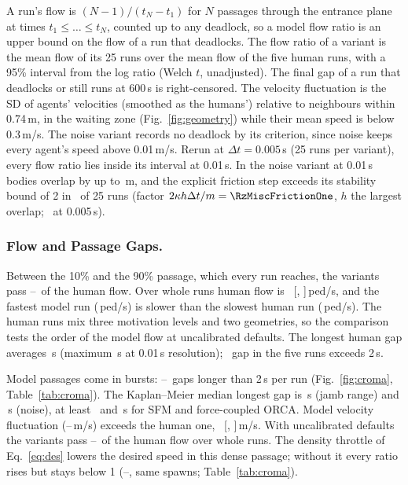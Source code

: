 A run's flow is $(N-1)/(t_N-t_1)$ for $N$ passages through the entrance plane at times $t_1\le\dots\le t_N$, counted up to any deadlock, so a model flow ratio is an upper bound on the flow of a run that deadlocks. The flow ratio of a variant is the mean flow of its 25 runs over the mean flow of the five human runs, with a 95\% interval from the log ratio (Welch $t$, unadjusted). The final gap of a run that deadlocks or still runs at 600\,s is right-censored. The velocity fluctuation is the SD of agents' velocities (smoothed as the humans') relative to neighbours within 0.74\,m, in the waiting zone (Fig.~\ref{fig:geometry}) while their mean speed is below 0.3\,m/s. The noise variant records no deadlock by its criterion, since noise keeps every agent's speed above 0.01\,m/s. Rerun at $\Delta t=0.005$\,s (25 runs per variant), every flow ratio lies inside its interval at 0.01\,s. In the noise variant at 0.01\,s bodies overlap by up to \RxCroSigFullOverlapM\,m, and the explicit friction step exceeds its stability bound of 2 in \RxCroSigFullFrictionRunsGeTwo\ of 25 runs (factor $2\kappa h\Delta t/m=\RzMiscFrictionOne$, $h$ the largest overlap; \RzMiscFrictionHalf\ at 0.005\,s).

%
\subsubsection{Flow and Passage Gaps.}
Between the 10\% and the 90\% passage, which every run reaches, the variants pass \RvAnineWindowRatioMin--\RvAnineWindowRatioMax\ of the human flow. Over whole runs human flow is \PendHumanFlow\ [\PendHumanFlowLo, \PendHumanFlowHi]\,ped/s, and the fastest model run (\PendModelFlowMax\,ped/s) is slower than the slowest human run (\PendHumanFlowMin\,ped/s). The human runs mix three motivation levels and two geometries, so the comparison tests the order of the model flow at uncalibrated defaults. The longest human gap averages \EtenHumanGap\,s (maximum \EtenHumanGapMax\,s at 0.01\,s resolution); \EtenHumanGapsOverTwoTotal\ gap in the five runs exceeds 2\,s.

Model passages come in bursts: \PendCThreeGapsTwo--\PendSigGapsTwo\ gaps longer than 2\,s per run (Fig.~\ref{fig:croma}, Table~\ref{tab:croma}). The Kaplan--Meier median longest gap is \RevDThreeCEdgeGapKMMedian\,s (jamb range) and \PendSigGapKMMedian\,s (noise), at least \PendCOneGapLowerMedianTwo\ and \PendCThreeGapLowerMedianTwo\,s for SFM and force-coupled ORCA. Model velocity fluctuation (\RevDThreeCOneFluct--\RevDThreeCSigFluct\,m/s) exceeds the human one, \EtenHumanFluct\ [\EtenHumanFluctLo, \EtenHumanFluctHi]\,m/s. With uncalibrated defaults the variants pass \RevDThreeRatioMin--\RevDThreeRatioMax\ of the human flow over whole runs. The density throttle of Eq.~\eqref{eq:des} lowers the desired speed in this dense passage; without it every ratio rises but stays below 1 (\RvBoneCroOffMin--\RvBoneCroOffMax, same spawns; Table~\ref{tab:croma}).
